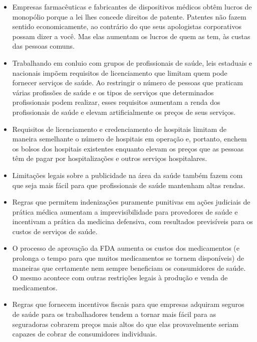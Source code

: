 \begin{itemize}
\item Empresas farmacêuticas e fabricantes de dispositivos médicos obtêm lucros de monopólio porque a lei lhes concede direitos de patente. Patentes não fazem sentido economicamente, ao contrário do que seus apologistas corporativos possam dizer a você. Mas elas aumentam os lucros de quem as tem, às custas das pessoas comuns.

\item Trabalhando em conluio com grupos de profissionais de saúde, leis estaduais e nacionais impõem requisitos de licenciamento que limitam quem pode fornecer serviços de saúde. Ao restringir o número de pessoas que praticam várias profissões de saúde e os tipos de serviços que determinados profissionais podem realizar, esses requisitos aumentam a renda dos profissionais de saúde e elevam artificialmente os preços de seus serviços.

\item Requisitos de licenciamento e credenciamento de hospitais limitam de maneira semelhante o número de hospitais em operação e, portanto, enchem os bolsos dos hospitais existentes enquanto elevam os preços que as pessoas têm de pagar por hospitalizações e outros serviços hospitalares.

\item Limitações legais sobre a publicidade na área da saúde também fazem com que seja mais fácil para que profissionais de saúde mantenham altas rendas.

\item Regras que permitem indenizações puramente punitivas em ações judiciais de prática médica aumentam a imprevisibilidade para provedores de saúde e incentivam a prática da medicina defensiva, com resultados previsíveis para os custos de serviços de saúde.

\item O processo de aprovação da FDA aumenta os custos dos medicamentos (e prolonga o tempo para que muitos medicamentos se tornem disponíveis) de maneiras que certamente nem sempre beneficiam os consumidores de saúde. O mesmo acontece com outras restrições legais à produção e venda de medicamentos.

\item Regras que fornecem incentivos fiscais para que empresas adquiram seguros de saúde para os trabalhadores tendem a tornar mais fácil para as seguradoras cobrarem preços mais altos do que elas provavelmente seriam capazes de cobrar de consumidores individuais.


\end{itemize}
